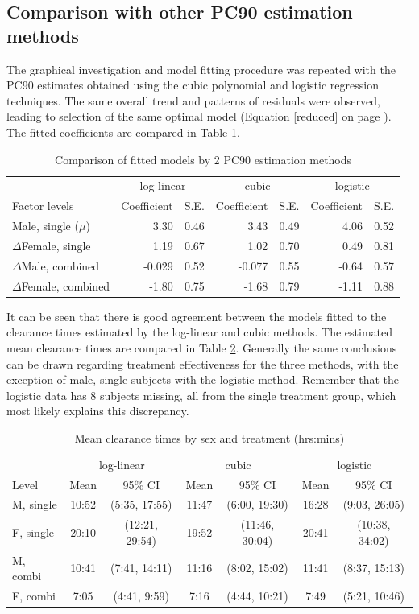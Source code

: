 \subsection{Comparison with other PC90 estimation methods}
The graphical investigation and model fitting procedure was repeated with the PC90 estimates obtained using the cubic polynomial and logistic regression techniques. The same overall trend and patterns of residuals were observed, leading to selection of the same optimal model (Equation \ref{reduced} on page \pageref{reduced}). The fitted coefficients are compared in Table \ref{compmeth}. 
\begin{table}[h]
\centering
\caption{Comparison of fitted models by 2 PC90 estimation methods}\label{compmeth}
\begin{tabular}{l|rr|rr|rr}
&\multicolumn{2}{c|}{log-linear}&\multicolumn{2}{c|}{cubic}&\multicolumn{2}{c}{logistic}\\
Factor levels&Coefficient&S.E.&Coefficient&S.E.&Coefficient&S.E.\\
\hline
Male, single ($\mu$)			& 3.30 & 0.46 & 3.43 &  0.49 & 4.06 & 0.52\\
$\Delta$Female, single		& 1.19 & 0.67 & 1.02 & 0.70  & 0.49 & 0.81\\
$\Delta$Male, combined		& -0.029 & 0.52 & -0.077 & 0.55 & -0.64 & 0.57\\
$\Delta$Female, combined	& -1.80 & 0.75 & -1.68 & 0.79  & -1.11 & 0.88\\
\hline
\end{tabular}
\end{table}

It can be seen that there is good agreement between the models fitted to the clearance times estimated by the log-linear and cubic methods. The estimated mean clearance times are compared in Table \ref{compinf}. Generally the same conclusions can be drawn regarding treatment effectiveness for the three methods, with the exception of male, single subjects with the logistic method. Remember that the logistic data has 8 subjects missing, all from the single treatment group, which most likely explains this discrepancy.
\begin{table}[h]
\centering
\caption{Mean clearance times by sex and treatment (hrs:mins)}\label{compinf}
\begin{tabular}{|l|cc|cc|cc|}
\hline
&\multicolumn{2}{c|}{log-linear}&\multicolumn{2}{c|}{cubic}&\multicolumn{2}{c|}{logistic}\\
Level		&Mean&95\% CI&Mean&95\% CI&Mean&95\% CI\\
\hline
M, single 		& 10:52 & (5:35, 17:55) &11:47& (6:00, 19:30) & 16:28 &(9:03, 26:05)\\
F, single		& 20:10 & (12:21,  29:54) &19:52&(11:46, 30:04) & 20:41&(10:38, 34:02)\\
M, combi	 	& 10:41 & (7:41, 14:11) &11:16&(8:02, 15:02) & 11:41 &(8:37, 15:13)\\
F, combi	 	& 7:05 & (4:41, 9:59) &7:16&(4:44, 10:21) & 7:49 & (5:21, 10:46)\\
\hline
\end{tabular}
\end{table}

